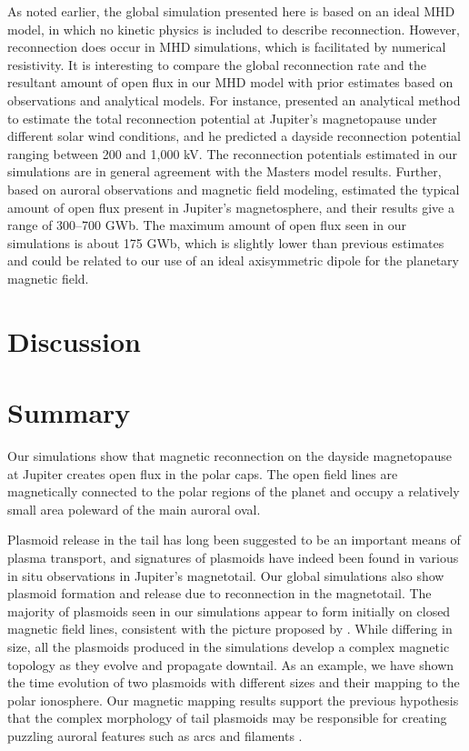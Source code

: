 As noted earlier, the global simulation presented here is based on an ideal MHD model, in which no kinetic physics is included to describe reconnection. However, reconnection does occur in MHD simulations, which is facilitated by numerical resistivity. It is interesting to compare the global reconnection rate and the resultant amount of open flux in our MHD model with prior estimates based on observations and analytical models. For instance,  presented an analytical method to estimate the total reconnection potential at Jupiter's magnetopause under different solar wind conditions, and he predicted a dayside reconnection potential ranging between 200 and 1,000 kV. The reconnection potentials estimated in our simulations are in general agreement with the Masters model results. Further, based on auroral observations and magnetic field modeling,  estimated the typical amount of open flux present in Jupiter's magnetosphere, and their results give a range of 300–700 GWb. The maximum amount of open flux seen in our simulations is about 175 GWb, which is slightly lower than previous estimates and could be related to our use of an ideal axisymmetric dipole for the planetary magnetic field.

\section{Discussion}


\section{Summary}

Our simulations show that magnetic reconnection on the dayside magnetopause at Jupiter creates open flux in the polar caps. The open field lines are magnetically connected to the polar regions of the planet and occupy a relatively small area poleward of the main auroral oval. 

Plasmoid release in the tail has long been suggested to be an important means of plasma transport, and signatures of plasmoids have indeed been found in various in situ observations in Jupiter's magnetotail. Our global simulations also show plasmoid formation and release due to reconnection in the magnetotail. The majority of plasmoids seen in our simulations appear to form initially on closed magnetic field lines, consistent with the picture proposed by . While differing in size, all the plasmoids produced in the simulations develop a complex magnetic topology as they evolve and propagate downtail. As an example, we have shown the time evolution of two plasmoids with different sizes and their mapping to the polar ionosphere. Our magnetic mapping results support the previous hypothesis that the complex morphology of tail plasmoids may be responsible for creating puzzling auroral features such as arcs and filaments \cite{Grodent2003a,McComas2007,Nichols2009a}. 

